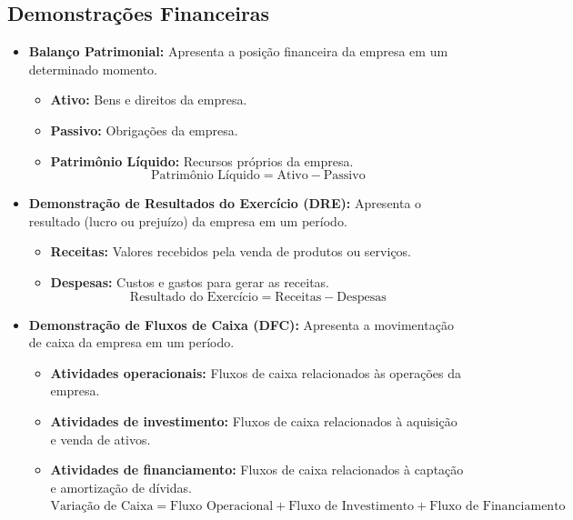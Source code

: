 \documentclass{article}
\begin{document}
\subsection{Demonstrações Financeiras}
\begin{itemize}
    \item \textbf{Balanço Patrimonial:} Apresenta a posição financeira da empresa em um determinado momento. 
    \begin{itemize}
        \item \textbf{Ativo:} Bens e direitos da empresa. 
        \item \textbf{Passivo:} Obrigações da empresa. 
        \item \textbf{Patrimônio Líquido:} Recursos próprios da empresa. 
        \begin{equation}
            \text{Patrimônio Líquido} = \text{Ativo} - \text{Passivo}
        \end{equation}
    \end{itemize}
    \item \textbf{Demonstração de Resultados do Exercício (DRE):} Apresenta o resultado (lucro ou prejuízo) da empresa em um período. 
    \begin{itemize}
        \item \textbf{Receitas:} Valores recebidos pela venda de produtos ou serviços. 
        \item \textbf{Despesas:} Custos e gastos para gerar as receitas. 
        \begin{equation}
            \text{Resultado do Exercício} = \text{Receitas} - \text{Despesas}
        \end{equation}
    \end{itemize}
    \item \textbf{Demonstração de Fluxos de Caixa (DFC):} Apresenta a movimentação de caixa da empresa em um período. 
    \begin{itemize}
        \item \textbf{Atividades operacionais:} Fluxos de caixa relacionados às operações da empresa. 
        \item \textbf{Atividades de investimento:} Fluxos de caixa relacionados à aquisição e venda de ativos. 
        \item \textbf{Atividades de financiamento:} Fluxos de caixa relacionados à captação e amortização de dívidas. \\
        
        $    \text{Variação de Caixa} = \text{Fluxo Operacional} + \text{Fluxo de Investimento} + \text{Fluxo de Financiamento} $
        

\end{itemize}
\end{itemize}
\end{document}
